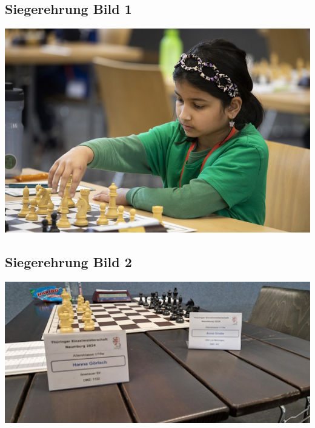 \subsection{Siegerehrung Bild 1}
\begin{center}
    \includegraphics[width=\linewidth,height=0.5625\linewidth,keepaspectratio]{THJEM2.jpg}
    \label{fig:Kashvi Bild}
\end{center}

\subsection{Siegerehrung Bild 2}
\begin{center}
    \includegraphics[width=0.8\linewidth,height=0.45\linewidth,keepaspectratio]{THJEM1.jpeg}
    \label{fig:THJEM Hanna Schild}
\end{center}
